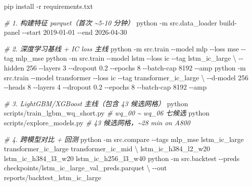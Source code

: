 \documentclass[
  fontset=fandol]{ctexart}
\newenvironment{Shaded}{\begin{snugshade}}{\end{snugshade}}
\newcommand{\AttributeTok}[1]{\textcolor[rgb]{0.77,0.63,0.00}{#1}}
\newcommand{\CommentTok}[1]{\textcolor[rgb]{0.56,0.35,0.01}{\textit{#1}}}
\newcommand{\DataTypeTok}[1]{\textcolor[rgb]{0.13,0.29,0.53}{#1}}
\newcommand{\ExtensionTok}[1]{#1}
\newcommand{\NormalTok}[1]{#1}
\begin{document}
\begin{Shaded}
\begin{Highlighting}[]
\ExtensionTok{pip}\NormalTok{ install }\AttributeTok{{-}r}\NormalTok{ requirements.txt}

\CommentTok{\# 1. 构建特征 parquet（首次 \textasciitilde{}5{-}10 分钟）}
\ExtensionTok{python} \AttributeTok{{-}m}\NormalTok{ src.data\_loader build{-}panel }\AttributeTok{{-}{-}start}\NormalTok{ 2019{-}01{-}01 }\AttributeTok{{-}{-}end}\NormalTok{ 2026{-}04{-}30}

\CommentTok{\# 2. 深度学习基线 + IC loss 主线}
\ExtensionTok{python} \AttributeTok{{-}m}\NormalTok{ src.train }\AttributeTok{{-}{-}model}\NormalTok{ mlp         }\AttributeTok{{-}{-}loss}\NormalTok{ mse }\AttributeTok{{-}{-}tag}\NormalTok{ mlp\_mse}
\ExtensionTok{python} \AttributeTok{{-}m}\NormalTok{ src.train }\AttributeTok{{-}{-}model}\NormalTok{ lstm        }\AttributeTok{{-}{-}loss}\NormalTok{ ic  }\AttributeTok{{-}{-}tag}\NormalTok{ lstm\_ic\_large }\DataTypeTok{\textbackslash{}}
    \AttributeTok{{-}{-}hidden}\NormalTok{ 256 }\AttributeTok{{-}{-}layers}\NormalTok{ 3 }\AttributeTok{{-}{-}dropout}\NormalTok{ 0.2 }\AttributeTok{{-}{-}epochs}\NormalTok{ 8 }\AttributeTok{{-}{-}batch{-}cap}\NormalTok{ 8192 }\AttributeTok{{-}{-}amp}
\ExtensionTok{python} \AttributeTok{{-}m}\NormalTok{ src.train }\AttributeTok{{-}{-}model}\NormalTok{ transformer }\AttributeTok{{-}{-}loss}\NormalTok{ ic  }\AttributeTok{{-}{-}tag}\NormalTok{ transformer\_ic\_large }\DataTypeTok{\textbackslash{}}
    \AttributeTok{{-}{-}d{-}model}\NormalTok{ 256 }\AttributeTok{{-}{-}heads}\NormalTok{ 8 }\AttributeTok{{-}{-}layers}\NormalTok{ 4 }\AttributeTok{{-}{-}dropout}\NormalTok{ 0.2 }\AttributeTok{{-}{-}epochs}\NormalTok{ 8 }\AttributeTok{{-}{-}batch{-}cap}\NormalTok{ 8192 }\AttributeTok{{-}{-}amp}

\CommentTok{\# 3. LightGBM/XGBoost 主线（包含 43 候选网格）}
\ExtensionTok{python}\NormalTok{ scripts/train\_lgbm\_wq\_short.py             }\CommentTok{\# wq\_00 \textasciitilde{} wq\_06 七候选}
\ExtensionTok{python}\NormalTok{ scripts/explore\_models.py                  }\CommentTok{\# 43 候选网格，\textasciitilde{}28 min on A800}

\CommentTok{\# 4. 跨模型对比 + 回测}
\ExtensionTok{python} \AttributeTok{{-}m}\NormalTok{ src.compare }\AttributeTok{{-}{-}tags}\NormalTok{ mlp\_mse lstm\_ic\_large transformer\_ic\_large transformer\_ic\_mid }\DataTypeTok{\textbackslash{}}
\NormalTok{    lstm\_ic\_h384\_l2\_w20 lstm\_ic\_h384\_l3\_w20 lstm\_ic\_h256\_l3\_w40}
\ExtensionTok{python} \AttributeTok{{-}m}\NormalTok{ src.backtest }\AttributeTok{{-}{-}preds}\NormalTok{ checkpoints/lstm\_ic\_large\_val\_preds.parquet }\DataTypeTok{\textbackslash{}}
    \AttributeTok{{-}{-}out}\NormalTok{ reports/backtest\_lstm\_ic\_large}


\end{Highlighting}
\end{Shaded}
\end{document}
